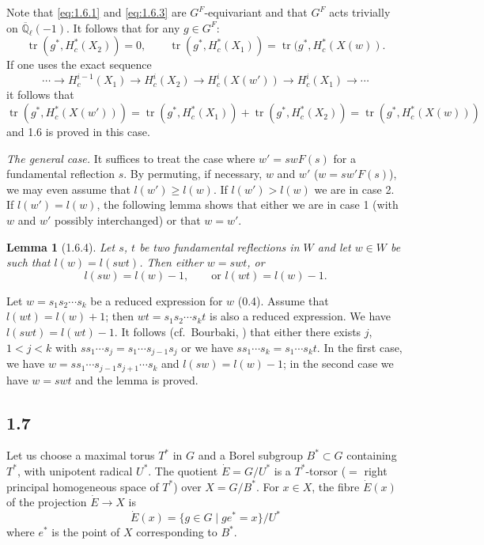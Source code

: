 \documentclass[11pt]{amsart}
\theoremstyle{plain}
\newtheorem{lemma}[theorem]{Lemma}
\theoremstyle{remark}
\DeclareMathOperator{\tr}{tr}
\begin{document}
Note that \eqref{eq:1.6.1} and \eqref{eq:1.6.3} are $G^F$-equivariant and that $G^F$ acts trivially on $\overline{\mathbb{Q}}_\ell(-1)$. It follows that for any $g \in G^F$:
\[
\tr(g^*, H_c^*(X_2)) = 0, \qquad \tr(g^*, H_c^*(X_1)) = \tr(g^*, H_c^*(X(w)).
\]
If one uses the exact sequence
\[
\cdots \longrightarrow H_c^{i-1}(X_1) \longrightarrow H_c^i(X_2) \longrightarrow H_c^i(X(w')) \longrightarrow H_c^i(X_1) \longrightarrow \cdots
\]
it follows that
\[
\tr(g^*, H_c^*(X(w'))) = \tr(g^*, H_c^*(X_1)) + \tr(g^*, H_c^*(X_2)) = \tr(g^*, H_c^*(X(w)))
\]
and 1.6 is proved in this case.

\textit{The general case.} It suffices to treat the case where $w' = swF(s)$ for a fundamental reflection $s$. By permuting, if necessary, $w$ and $w'$ ($w = sw'F(s)$), we may even assume that $l(w') \ge l(w)$. If $l(w') > l(w)$ we are in case 2. If $l(w') = l(w)$, the following lemma shows that either we are in case 1 (with $w$ and $w'$ possibly interchanged) or that $w = w'$.

\begin{lemma}[1.6.4]
Let $s$, $t$ be two fundamental reflections in $W$ and let $w \in W$ be such that $l(w) = l(swt)$. Then either $w = swt$, or
\[
l(sw) = l(w) - 1, \qquad \text{or } l(wt) = l(w) - 1.
\]
\end{lemma}

Let $w = s_1 s_2 \cdots s_k$ be a reduced expression for $w$ (0.4). Assume that $l(wt) = l(w) + 1$; then $wt = s_1 s_2 \cdots s_k t$ is also a reduced expression. We have $l(swt) = l(wt) - 1$. It follows (cf.\ Bourbaki, \cite[Ch.\ IV, \S 1, Lemme 3]{Bou}) that either there exists $j$, $1 < j < k$ with $ss_1 \cdots s_j = s_1 \cdots s_{j-1}s_j$ or we have $ss_1 \cdots s_k = s_1 \cdots s_k t$. In the first case, we have $w = ss_1 \cdots s_{j-1}s_{j+1} \cdots s_k$ and $l(sw) = l(w) - 1$; in the second case we have $w = swt$ and the lemma is proved.

\subsection{1.7} Let us choose a maximal torus $T^*$ in $G$ and a Borel subgroup $B^* \subset G$ containing $T^*$, with unipotent radical $U^*$. The quotient $\dot{E} = G/U^*$ is a $T^*$-torsor ($=$ right principal homogeneous space of $T^*$) over $X = G/B^*$. For $x \in X$, the fibre $\dot{E}(x)$ of the projection $\dot{E} \to X$ is
\[
\dot{E}(x) = \{g \in G \mid ge^* = x\}/U^*
\]
where $e^*$ is the point of $X$ corresponding to $B^*$.
\end{document}
